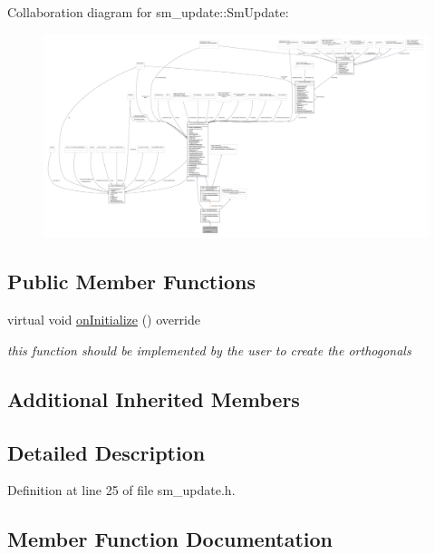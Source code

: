 Collaboration diagram for sm\+\_\+update\+:\+:Sm\+Update\+:
\nopagebreak
\begin{figure}[H]
\begin{center}
\leavevmode
\includegraphics[width=350pt]{structsm__update_1_1SmUpdate__coll__graph}
\end{center}
\end{figure}
\subsection*{Public Member Functions}
\begin{DoxyCompactItemize}
\item 
virtual void \hyperlink{structsm__update_1_1SmUpdate_a760548839a6feee77250ca1d97db7da1}{on\+Initialize} () override
\begin{DoxyCompactList}\small\item\em this function should be implemented by the user to create the orthogonals \end{DoxyCompactList}\end{DoxyCompactItemize}
\subsection*{Additional Inherited Members}


\subsection{Detailed Description}


Definition at line 25 of file sm\+\_\+update.\+h.



\subsection{Member Function Documentation}
